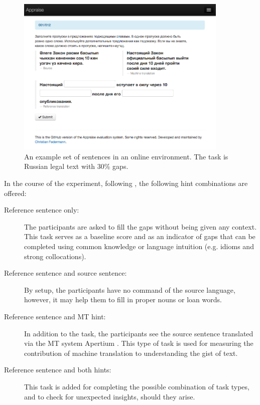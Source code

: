 \documentclass[11pt]{article}
\newcommand{\comment}[1]{\marginpar{\scriptsize\sf \textcolor{blue}{#1}}}
\begin{document}
\begin{figure}
  \centering
\includegraphics[width=0.9\textwidth,resolution=144]{appraise-scr}
 \caption{An example set of sentences in an online environment. The task is Russian legal text with 30\% gaps.}
\label{figure:screenshot}
\end{figure}

\comment{EA: I don't really have a good explanation why we used source+mt tasks, except for being exhaustive. could you suggest anything?}
In the course of the experiment, following \cite{oregan13}, the following hint combinations are offered:
\begin{description}
\item[Reference sentence only:] The participants are asked to fill the gaps without being given
any context. This task serves as a baseline score and as an indicator of gaps
that can be completed using common knowledge or language intuition (e.g.
idioms and strong collocations).
\item[Reference sentence and source sentence:] By setup, the
participants have no command of the source language, however, it may help them to fill
in proper nouns or loan words.
\item[Reference sentence and MT hint:] In addition to the task, the
participants see the source sentence translated via the MT system Apertium \citep{forcada11}. This type of task is
used for measuring the contribution of machine translation to understanding the
gist of text.
\item[Reference sentence and both hints:] This task is
added for completing the possible combination of task types, and to check
for unexpected insights, should they arise.
\end{description}
\end{document}
